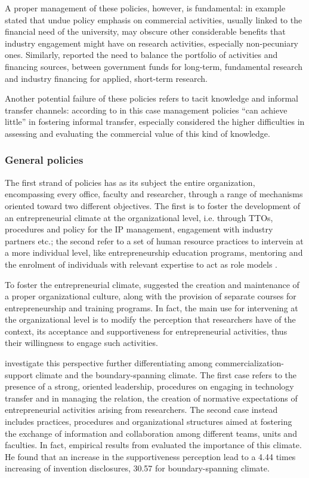 A proper management of these policies, however, is fundamental: \citet{DEste2011} in example stated that undue policy emphasis on commercial activities, usually linked to the financial need of the university, may obscure other considerable benefits that industry engagement might have on research activities, especially non-pecuniary ones. Similarly, \citet{Debackere2005} reported the need to balance the portfolio of activities and financing sources, between government funds for long-term, fundamental research and industry financing for applied, short-term research. 

Another potential failure of these policies refers to tacit knowledge and informal transfer channels: according to \citet{Muscio2010} in this case management policies \enquote{can achieve little} in fostering informal transfer, especially considered the higher difficulties in assessing and evaluating the commercial value of this kind of knowledge. 

\subsubsection{General policies}

The first strand of policies has as its subject the entire organization, encompassing every office, faculty and researcher, through a range of mechanisms oriented toward two different objectives. The first is to foster the development of an entrepreneurial climate at the organizational level, i.e. through TTOs, procedures and policy for the IP management, engagement with industry partners etc.; the second refer to a set of human resource practices to intervein at a more individual level, like entrepreneurship education programs, mentoring and the enrolment of individuals with relevant expertise to act as role models \citep{Guerrero2014}. 

To foster the entrepreneurial climate, \citet{Klofsten2000} suggested the creation and maintenance of a proper organizational culture, along with the provision of separate courses for entrepreneurship and training programs. In fact, the main use for intervening at the organizational level is to modify the perception that researchers have of the context, its acceptance and supportiveness for entrepreneurial activities, thus their willingness to engage such activities.

\citet{Hunter2011} investigate this perspective further differentiating among commercialization-support climate and the boundary-spanning climate. The first case refers to the presence of a strong, oriented leadership, procedures on engaging in technology transfer and in managing the relation, the creation of normative expectations of entrepreneurial activities arising from researchers. The second case instead includes practices, procedures and organizational structures aimed at fostering the exchange of information and collaboration among different teams, units and faculties. In fact, empirical results from \citet{Hunter2011} evaluated the importance of this climate. He found that an increase in the supportiveness perception lead to a 4.44 times increasing of invention disclosures, 30.57 for boundary-spanning climate. 

